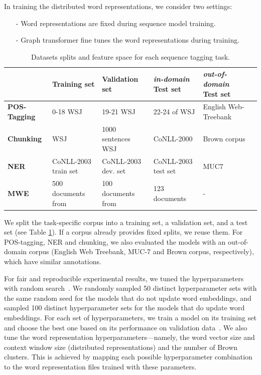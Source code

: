 In training the distributed word representations, we consider two settings: 

\begin{small}
\begin{itemize}
\item[-] Word representations are fixed during sequence model training. 
\item[-] Graph transformer fine tunes the word representations during training. 
\end{itemize}
\end{small}

\begin{table}
\caption{Datasets splits and feature space for each sequence tagging task.}
\begin{small}
\begin{tabular}{lllp{}ll}
\hline
			& \textbf{Training set} & \textbf{Validation set} & \textbf{\textit{in-domain} Test set} & \textbf{\textit{out-of-domain} Test set} \\ \hline
\textbf{POS-Tagging} & 0-18 WSJ & 19-21 WSJ & 22-24 of WSJ & English Web-Treebank  \\
\textbf{Chunking} & WSJ & 1000 sentences WSJ & CoNLL-2000 & Brown corpus \\
\textbf{NER} & CoNLL-2003 train set & CoNLL-2003 dev. set & CoNLL-2003 test set & MUC7  \\
\textbf{MWE} & 500 documents from & 100 documents from & 123 documents & - \\
\hline
\end{tabular}
\label{datasplit}
\end{small}
\end{table}

We split the task-specific corpus into a training set, a validation set, and a test set (see Table \ref{datasplit}). If a corpus already provides fixed splits, we reuse them. For POS-tagging,  NER and chunking, we also evaluated the models with an out-of-domain corpus (English Web Treebank, MUC-7 and Brown corpus, respectively), which have similar annotations.

For fair and reproducible experimental results, we tuned the hyperparameters with random search~\cite{bergstra2012random}. 
We randomly sampled 50 distinct hyperparameter sets with the same random seed for the models that do not update word embeddings, and sampled 100 distinct hyperparameter sets for the models that do update word embeddings. 
For each set of hyperparameters, we train a model on its training set and choose the best one based on its performance on validation data~\cite{turian2010word}. 
We also tune the word representation hyperparameters---namely, the word vector size and context window size (distributed representations) and the number of Brown clusters.
This is achieved by mapping each possible hyperparameter combination to the word representation files trained with these parameters. 

